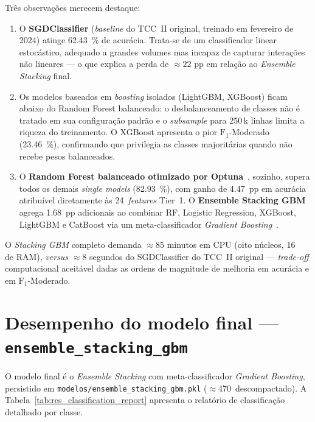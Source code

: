 Três observações merecem destaque:

\begin{enumerate}
  \item O \textbf{SGDClassifier} (\emph{baseline} do TCC~II original, treinado em fevereiro de 2024) atinge \SI{62,43}{\percent} de acurácia. Trata-se de um classificador linear estocástico, adequado a grandes volumes mas incapaz de capturar interações não lineares --- o que explica a perda de \(\approx 22\) pp em relação ao \emph{Ensemble Stacking} final.

  \item Os modelos baseados em \emph{boosting} isolados (LightGBM, XGBoost) ficam abaixo do Random Forest balanceado: o desbalanceamento de classes não é tratado em sua configuração padrão e o \emph{subsample} para 250\,k linhas limita a riqueza do treinamento. O XGBoost apresenta o pior \(\text{F}_1\)-Moderado (\SI{23,46}{\percent}), confirmando que privilegia as classes majoritárias quando não recebe pesos balanceados.

  \item O \textbf{Random Forest balanceado otimizado por Optuna}~\cite{akiba2019optuna}, sozinho, supera todos os demais \emph{single models} (\SI{82,93}{\percent}), com ganho de \SI{4,47}{pp} em acurácia atribuível diretamente às 24~\emph{features} Tier~1. O \textbf{Ensemble Stacking GBM} agrega \SI{1,68}{pp} adicionais ao combinar RF, Logistic Regression, XGBoost, LightGBM e CatBoost via um meta-classificador \emph{Gradient Boosting}~\cite{friedman2001greedy,wolpert1992stacked,chen2016xgboost,ke2017lightgbm,prokhorenkova2018catboost}.
\end{enumerate}

O \emph{Stacking GBM} completo demanda \(\approx 85\) minutos em CPU (oito núcleos, \SI{16}{\giga\byte} de RAM), \emph{versus} \(\approx 8\) segundos do SGDClassifier do TCC~II original --- \emph{trade-off} computacional aceitável dadas as ordens de magnitude de melhoria em acurácia e em \(\text{F}_1\)-Moderado.

\section{Desempenho do modelo final --- \texttt{ensemble\_stacking\_gbm}}
\label{sec:res_modelo_final}

O modelo final é o \emph{Ensemble Stacking} com meta-classificador \emph{Gradient Boosting}, persistido em \texttt{modelos/ensemble\_stacking\_gbm.pkl} (\(\approx\num{470}\)\, descompactado). A Tabela~\ref{tab:res_classification_report} apresenta o relatório de classificação detalhado por classe.

